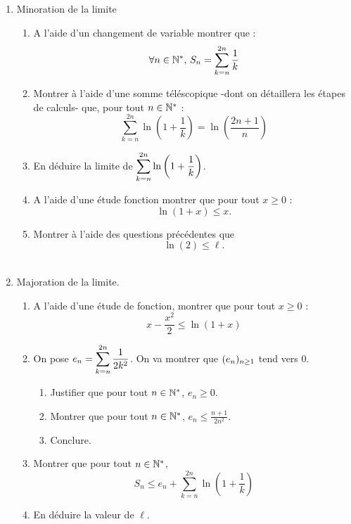 \documentclass[a4paper, 11pt]{article}
\begin{document}
\begin{probleme}
\begin{enumerate}
\item   Minoration de la limite
\begin{enumerate}

\item A l'aide d'un changement de variable montrer que : 
$$\forall n\in \mathbb{N}^*,\,  S_n  =\sum_{k=n}^{2n}\frac1{k}$$
\item Montrer à l'aide d'une somme téléscopique -dont on détaillera les étapes de calculs-  que, pour tout $n\in\mathbb{N}^*$ :
$$\sum_{k=n}^{2n} \ln\left( 1 +\frac{1}{k}\right) =\ln\left(\frac{2n+1}{n}\right) $$

\item En déduire la limite de $\displaystyle \sum_{k=n}^{2n}\ln\left( 1 +\frac{1}{k}\right)$.

\item A l'aide d'une étude fonction  montrer que pour tout $x\geq 0 $ :
$$ \ln (1+x) \leq x.$$



\item Montrer à l'aide des questions précédentes que $$\ln(2)\leq \ell.$$\\ 

\end{enumerate}
\item Majoration de la limite.
\begin{enumerate}
\item A l'aide d'une étude de fonction,  montrer que pour tout $x\geq 0 $ :
$$x-\frac{x^2}{2} \leq  \ln (1+x)$$
\item On pose $e_n  =\displaystyle \sum_{k=n}^{2n} \frac{1}{2k^2}$. On va montrer que $(e_n)_{n\geq 1}$ tend vers $0$. 
\begin{enumerate}
\item Justifier que pour tout $n\in \mathbb{N}^*$, $e_n \geq 0$.
\item Montrer que pour tout $n\in \mathbb{N}^*$, $e_n \leq \frac{n+1}{2n^2}$.
\item Conclure. 
\end{enumerate}
\item Montrer que pour tout $n\in \mathbb{N}^*$,  
$$S_n \leq e_n + \sum_{k=n}^{2n}\ln\left( 1 +\frac{1}{k}\right)$$
\item En déduire la valeur de $\ell$. 

\end{enumerate}

\end{enumerate}


\end{probleme}
\end{document}
